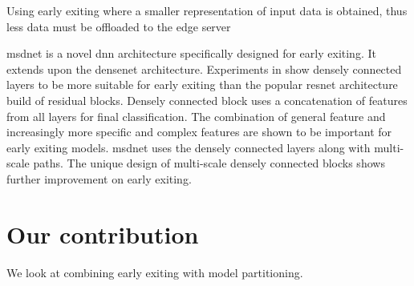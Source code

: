 Using early exiting where a smaller representation of input data is obtained, thus less data must be offloaded to the edge server

\gls{msdnet} \cite{huang_multi-scale_2017} is a novel \gls{dnn} architecture specifically designed for early exiting. It extends upon the \gls{densenet} \cite{huang_densely_2016} architecture. Experiments in \cite{huang_multi-scale_2017} show densely connected layers to be more suitable for early exiting than the popular \gls{resnet} architecture build of residual blocks. Densely connected block uses a concatenation of features from all layers for final classification. The combination of  general feature and increasingly more specific and complex features are shown to be important for early exiting models. \gls{msdnet} uses the densely connected layers along with multi-scale paths. The unique design of multi-scale densely connected blocks shows further improvement on early exiting.

\section{Our contribution}

We look at combining early exiting with model partitioning. 
